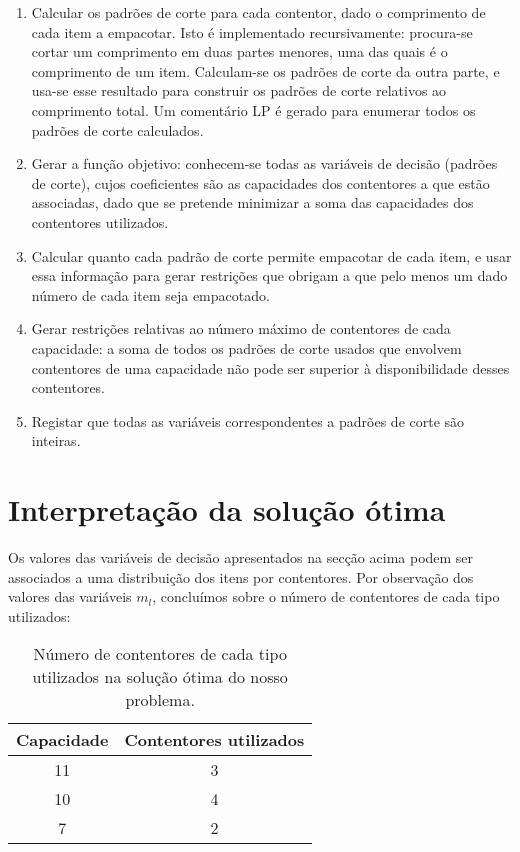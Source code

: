 \documentclass[12pt, a4paper, titlepage]{article}
\begin{document}
\begin{enumerate}
    \item Calcular os padrões de corte para cada contentor, dado o comprimento de cada item a
        empacotar. Isto é implementado recursivamente: procura-se cortar um comprimento em duas
        partes menores, uma das quais é o comprimento de um item. Calculam-se os padrões de corte da
        outra parte, e usa-se esse resultado para construir os padrões de corte relativos ao
        comprimento total. Um comentário LP é gerado para enumerar todos os padrões de corte
        calculados.

    \item Gerar a função objetivo: conhecem-se todas as variáveis de decisão (padrões de corte),
        cujos coeficientes são as capacidades dos contentores a que estão associadas, dado que se
        pretende minimizar a soma das capacidades dos contentores utilizados.

    \item Calcular quanto cada padrão de corte permite empacotar de cada item, e usar essa
        informação para gerar restrições que obrigam a que pelo menos um dado número de cada item
        seja empacotado.

    \item Gerar restrições relativas ao número máximo de contentores de cada capacidade: a soma de
        todos os padrões de corte usados que envolvem contentores de uma capacidade não pode ser
        superior à disponibilidade desses contentores.

    \item Registar que todas as variáveis correspondentes a padrões de corte são inteiras.
\end{enumerate}

\section{Interpretação da solução ótima}

Os valores das variáveis de decisão apresentados na secção acima podem ser associados a uma
distribuição dos itens por contentores. Por observação dos valores das variáveis $m_l$, concluímos
sobre o número de contentores de cada tipo utilizados:

\begin{table}[H]
    \begin{center}
        \begin{tabular}{c|c}
            Capacidade & Contentores utilizados \\
            \hline
            11         & 3 \\
            10         & 4 \\
            7          & 2
        \end{tabular}
    \end{center}
    \caption{Número de contentores de cada tipo utilizados na solução ótima do nosso problema.}
\end{table}
\end{document}
